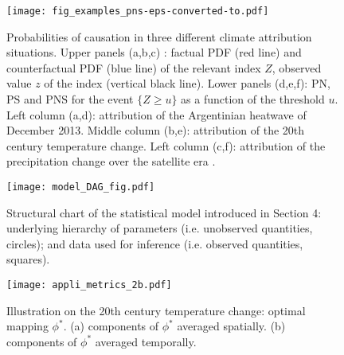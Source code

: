 \documentclass[12pt]{article}
\newcommand{\PN}{\textrm{PN}}
\newcommand{\PS}{\textrm{PS}}
\newcommand{\PNS}{\textrm{PNS}}
\begin{document}
\begin{figure}[t]
\begin{center} 
\noindent\texttt{[image: fig\_examples\_pns-eps-converted-to.pdf]}\\
\end{center} 
\caption{Probabilities of causation in three different climate attribution situations. Upper panels (a,b,c) : factual PDF (red line) and counterfactual PDF (blue line) of the relevant index $Z$, observed value $z$ of the index (vertical black line). Lower panels (d,e,f): $\PN$, $\PS$ and $\PNS$ for the event $\{Z\geq u\}$ as a function of the threshold $u$. Left column (a,d): attribution of the Argentinian heatwave of December 2013. Middle column (b,e): attribution of the 20th century temperature change. Left column (c,f): attribution of the precipitation change over the satellite era \citep{MB13}.}
\label{f2b}
\end{figure}

\begin{figure}[t]
\begin{center} 
\noindent\texttt{[image: model\_DAG\_fig.pdf]}\\
\end{center} 
\caption{Structural chart of the statistical model introduced in Section 4: underlying hierarchy of parameters (i.e. unobserved quantities, circles); and data used for inference (i.e. observed quantities, squares).}
\label{f2b}
\end{figure}



\begin{figure}[t]
\begin{center} 
\noindent\texttt{[image: appli\_metrics\_2b.pdf]}\\
\end{center} 
\caption{Illustration on the 20th century temperature change: optimal mapping $\phi^*$. (a) components of $\phi^*$ averaged spatially. (b) components of $\phi^*$ averaged temporally. }
\label{f4}
\end{figure}
\end{document}

